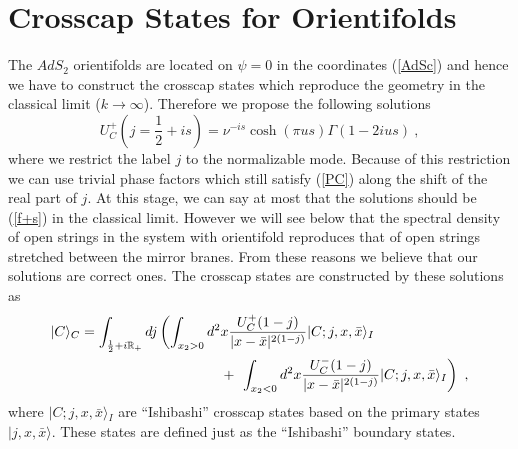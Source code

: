 \documentclass[a4paper,12pt]{article}
\newcommand{\br}{\mathbb R}
\newcommand{\ket}[1]{{|#1\rangle}{}}
\newcommand{\nn}{\nonumber\\}
\begin{document}

\section{Crosscap States for Orientifolds}
\indent

The $AdS_2$ orientifolds are located on $\psi = 0$ in the coordinates 
(\ref{AdSc}) and hence we have to construct the crosscap states which
reproduce the geometry in the classical limit  ($k \to \infty$).
Therefore we propose the following solutions 
\begin{equation}
  U^+_C (j = \textstyle \frac{1}{2} + is ) = 
       \nu^{-is} \cosh ( \pi u s) \Gamma(1 -2ius)~,
\label{f+s}
\end{equation}
where we restrict the label $j$ to the normalizable mode. 
Because of this restriction we can use trivial phase factors which still
satisfy (\ref{PC}) along the shift of the real part of $j$.
At this stage, we can say at most that the solutions should be (\ref{f+s})
in the classical limit. However we will see below that the spectral
density of open strings in the system with orientifold reproduces that
of open strings stretched between the mirror branes. 
From these reasons we believe that our solutions are correct ones.
The crosscap states are constructed by these solutions as
\begin{eqnarray}
 \lefteqn{\ket{C}_C =  \int_{\frac{1}{2} + i \br_+} dj \left(
 \int _{x_2 > 0} d^2 x \frac{U^+_{C} (1-j)}{|x - \bar{x}|^{2(1-j)}} 
  \ket{C;j,x,\bar{x}}_I \right.}\nn  && \hspace{4cm}+~\left.
  \int _{x_2 < 0} d^2 x \frac{U^-_{C} (1-j)}{|x - \bar{x}|^{2(1-j)}} 
  \ket{C;j,x,\bar{x}}_I 
\right) ~,
\end{eqnarray}
where $\ket{C;j,x,\bar{x}}_I$ are ``Ishibashi'' crosscap states based on the
primary states $\ket{j,x,\bar{x}}$.  These states are defined just as
the ``Ishibashi'' boundary states.
\end{document}
